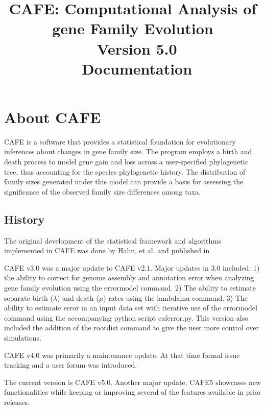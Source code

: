 \documentclass{article}
\title{CAFE: \textbf{C}omputational \textbf{A}nalysis of gene \textbf{F}amily \textbf{E}volution\\\
Version 5.0\\\
Documentation}
\author{}
\newcommand{\shortname}{CAFE5 }
\begin{document}
\maketitle
\pagebreak
\tableofcontents
\pagebreak
\section{About CAFE}
CAFE is a software that provides a statistical foundation for evolutionary inferences about changes in gene family size. The program employs a birth and death process to model gene gain and loss across a user-specified phylogenetic tree, thus accounting for the species phylogenetic history. The distribution of family sizes generated under this model can provide a basis for assessing the significance of the observed family size differences among taxa.
\subsection{History}
The original development of the statistical framework and algorithms implemented in CAFE was done by Hahn, et al. and published in \textit{\bibentry{hahn2005estimating}}

CAFE v3.0 was a major update to CAFE v2.1. Major updates in 3.0 included: 1) the ability to correct for genome assembly and annotation error when analyzing gene family evolution using the errormodel command. 2) The ability to estimate separate birth ($\lambda$) and death ($\mu$) rates using the lambdamu command. 3) The ability to estimate error in an input data set with iterative use of the errormodel command using the accompanying python script caferror.py. This version also included the addition of the rootdist command to give the user more control over simulations.

CAFE v4.0 was primarily a maintenance update. At that time formal issue tracking and a user forum was introduced.

The current version is CAFE v5.0. Another major update, \shortname showcases new functionalities while keeping or improving several of the features available in prior releases.
\end{document}
